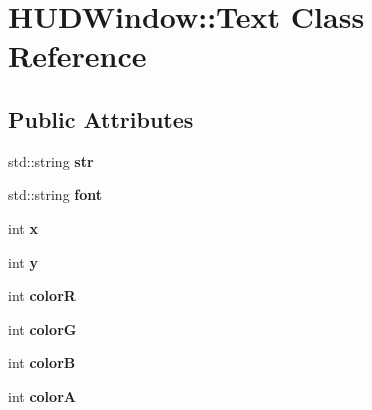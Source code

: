 \hypertarget{class_h_u_d_window_1_1_text}{\section{H\+U\+D\+Window\+:\+:Text Class Reference}
\label{class_h_u_d_window_1_1_text}
}
\subsection*{Public Attributes}
\begin{DoxyCompactItemize}
\item 
\hypertarget{class_h_u_d_window_1_1_text_a33f10a1d33234b7820a1adbd89c213da}{std\+::string {\bfseries str}}\label{class_h_u_d_window_1_1_text_a33f10a1d33234b7820a1adbd89c213da}

\item 
\hypertarget{class_h_u_d_window_1_1_text_a90ba2f6ad7c27f789ed4f1c1d3b5f51e}{std\+::string {\bfseries font}}\label{class_h_u_d_window_1_1_text_a90ba2f6ad7c27f789ed4f1c1d3b5f51e}

\item 
\hypertarget{class_h_u_d_window_1_1_text_a8fa18534f2539eb429a61e81d4757aa0}{int {\bfseries x}}\label{class_h_u_d_window_1_1_text_a8fa18534f2539eb429a61e81d4757aa0}

\item 
\hypertarget{class_h_u_d_window_1_1_text_a9a442ada676af7400c5e2fb029e21631}{int {\bfseries y}}\label{class_h_u_d_window_1_1_text_a9a442ada676af7400c5e2fb029e21631}

\item 
\hypertarget{class_h_u_d_window_1_1_text_ac27e9b9d747436e29a58e2c1a1588c9e}{int {\bfseries color\+R}}\label{class_h_u_d_window_1_1_text_ac27e9b9d747436e29a58e2c1a1588c9e}

\item 
\hypertarget{class_h_u_d_window_1_1_text_a291c3396885b04078e2679f77b1178f4}{int {\bfseries color\+G}}\label{class_h_u_d_window_1_1_text_a291c3396885b04078e2679f77b1178f4}

\item 
\hypertarget{class_h_u_d_window_1_1_text_ac9c3cdca8295cf2934df815e82ca7e4d}{int {\bfseries color\+B}}\label{class_h_u_d_window_1_1_text_ac9c3cdca8295cf2934df815e82ca7e4d}

\item 
\hypertarget{class_h_u_d_window_1_1_text_a21f5f0d45795fb8f64fc9140aa912478}{int {\bfseries color\+A}}\label{class_h_u_d_window_1_1_text_a21f5f0d45795fb8f64fc9140aa912478}


\end{DoxyCompactItemize}
